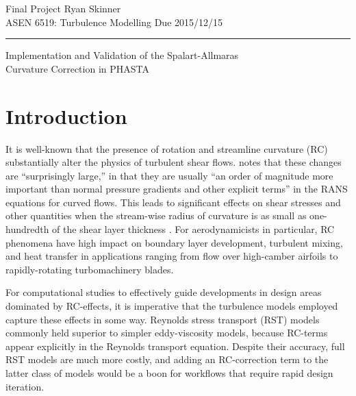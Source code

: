 \documentclass[11pt]{article}
\begin{document}
\pagestyle{fancyplain}
\lhead{}
\chead{}
\rhead{}
\cfoot{\hrule \thepage}

\noindent
{\Large Final Project}
\hfill
{\large Ryan Skinner}
\\[0.5ex]
{\large ASEN 6519: Turbulence Modelling}
\hfill
{\large Due 2015/12/15}\\
\hrule
\vspace{6pt}

\vspace{0.5in}
\begin{center}
\LARGE Implementation and Validation of the Spalart-Allmaras \\ Curvature Correction in PHASTA
\end{center}
\vspace{0.2in}

\section{Introduction} %

It is well-known that the presence of rotation and streamline curvature (RC) substantially alter the physics of turbulent shear flows. \citet{bradshaw1973} notes that these changes are ``surprisingly large,'' in that they are usually ``an order of magnitude more important than normal pressure gradients and other explicit terms'' in the RANS equations for curved flows. This leads to significant effects on shear stresses and other quantities when the stream-wise radius of curvature is as small as one-hundredth of the shear layer thickness \citep{bradshaw1973}. For aerodynamicists in particular, RC phenomena have high impact on boundary layer development, turbulent mixing, and heat transfer in applications ranging from flow over high-camber airfoils to rapidly-rotating turbomachinery blades.

For computational studies to effectively guide developments in design areas dominated by RC-effects, it is imperative that the turbulence models employed capture these effects in some way. Reynolds stress transport (RST) models commonly held superior to simpler eddy-viscosity models, because RC-terms appear explicitly in the Reynolds transport equation. Despite their accuracy, full RST models are much more costly, and adding an RC-correction term to the latter class of models would be a boon for workflows that require rapid design iteration.
\end{document}
